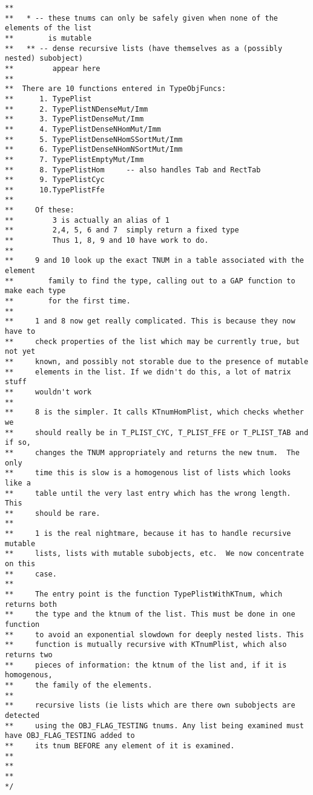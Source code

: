 \documentclass{article}
\begin{document}
\begin{verbatim}
**
**   * -- these tnums can only be safely given when none of the elements of the list
**        is mutable
**   ** -- dense recursive lists (have themselves as a (possibly nested) subobject)
**         appear here
**
**  There are 10 functions entered in TypeObjFuncs:
**      1. TypePlist
**      2. TypePlistNDenseMut/Imm
**      3. TypePlistDenseMut/Imm
**      4. TypePlistDenseNHomMut/Imm
**      5. TypePlistDenseNHomSSortMut/Imm
**      6. TypePlistDenseNHomNSortMut/Imm
**      7. TypePlistEmptyMut/Imm
**      8. TypePlistHom     -- also handles Tab and RectTab
**      9. TypePlistCyc
**      10.TypePlistFfe
**
**     Of these:
**         3 is actually an alias of 1
**         2,4, 5, 6 and 7  simply return a fixed type
**         Thus 1, 8, 9 and 10 have work to do.
**
**     9 and 10 look up the exact TNUM in a table associated with the element
**        family to find the type, calling out to a GAP function to make each type
**        for the first time.
**
**     1 and 8 now get really complicated. This is because they now have to
**     check properties of the list which may be currently true, but not yet
**     known, and possibly not storable due to the presence of mutable
**     elements in the list. If we didn't do this, a lot of matrix stuff
**     wouldn't work
**
**     8 is the simpler. It calls KTnumHomPlist, which checks whether we
**     should really be in T_PLIST_CYC, T_PLIST_FFE or T_PLIST_TAB and if so,
**     changes the TNUM appropriately and returns the new tnum.  The only
**     time this is slow is a homogenous list of lists which looks like a
**     table until the very last entry which has the wrong length. This
**     should be rare.
**     
**     1 is the real nightmare, because it has to handle recursive mutable
**     lists, lists with mutable subobjects, etc.  We now concentrate on this
**     case.
**
**     The entry point is the function TypePlistWithKTnum, which returns both
**     the type and the ktnum of the list. This must be done in one function
**     to avoid an exponential slowdown for deeply nested lists. This
**     function is mutually recursive with KTnumPlist, which also returns two
**     pieces of information: the ktnum of the list and, if it is homogenous,
**     the family of the elements.
**
**     recursive lists (ie lists which are there own subobjects are detected
**     using the OBJ_FLAG_TESTING tnums. Any list being examined must have OBJ_FLAG_TESTING added to
**     its tnum BEFORE any element of it is examined.
**
**     
**
*/
\end{verbatim}
\end{document}
